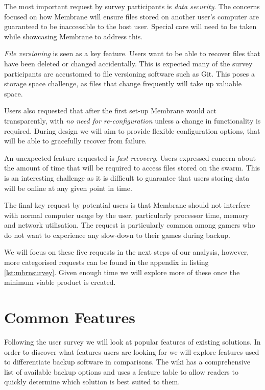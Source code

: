 \documentclass[11pt, a4paper, twocolumn, twoside]{report}
\begin{document}
The most important request by survey participants is \emph{data security}. The concerns focused on how Membrane will ensure files stored on another user's computer are guaranteed to be inaccessible to the host user. Special care will need to be taken while showcasing Membrane to address this.

\emph{File versioning} is seen as a key feature. Users want to be able to recover files that have been deleted or changed accidentally. This is expected many of the survey participants are accustomed to file versioning software such as Git. This poses a storage space challenge, as files that change frequently will take up valuable space.

Users also requested that after the first set-up Membrane would act transparently, with \emph{no need for re-configuration} unless a change in functionality is required. During design we will aim to provide flexible configuration options, that will be able to gracefully recover from failure.

An unexpected feature requested is \emph{fast recovery}. Users expressed concern about the amount of time that will be required to access files stored on the swarm. This is an interesting challenge as it is difficult to guarantee that users storing data will be online at any given point in time.

The final key request by potential users is that Membrane should not interfere with normal computer usage by the user, particularly processor time, memory and network utilisation. The request is particularly common among gamers who do not want to experience any slow-down to their games during backup.

We will focus on these five requests in the next steps of our analysis, however, more categorised requests can be found in the appendix in listing \ref{lst:mbrnsurvey}. Given enough time we will explore more of these once the minimum viable product is created.

\section{Common Features} \label{sec:commonfeatures}

Following the user survey we will look at popular features of existing solutions. In order to discover what features users are looking for we will explore features used to differentiate backup software in comparisons. The \cite{arch2017syncandbackup} wiki has a comprehensive list of available backup options and uses a feature table to allow readers to quickly determine which solution is best suited to them.
\end{document}
